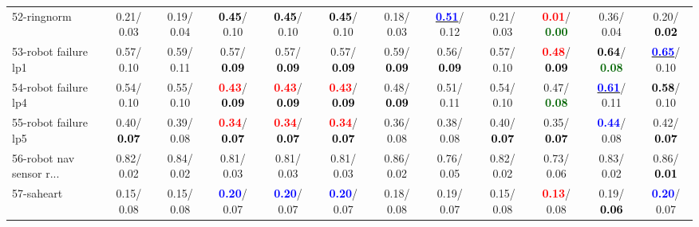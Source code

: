 \begin{table}[h]
\begin{center}
{\begin{tabular}{lc|c|c|c|c|c|c|c|c|c|c}
52-ringnorm &   0.21/  0.03 &   0.19/  0.04 & \textcolor{black}{\textbf{  0.45}}/  0.10 & \textcolor{black}{\textbf{  0.45}}/  0.10 & \textcolor{black}{\textbf{  0.45}}/  0.10 &   0.18/  0.03 & \underline{\textcolor{blue}{\textbf{  0.51}}}/  0.12 &   0.21/  0.03 & \textcolor{red}{\textbf{  0.01}}/\textcolor{darkgreen}{\textbf{  0.00}} &   0.36/  0.04 &   0.20/\textcolor{black}{\textbf{  0.02}} \\
53-robot failure lp1 &   0.57/  0.10 &   0.59/  0.11 &   0.57/\textcolor{black}{\textbf{  0.09}} &   0.57/\textcolor{black}{\textbf{  0.09}} &   0.57/\textcolor{black}{\textbf{  0.09}} &   0.59/\textcolor{black}{\textbf{  0.09}} &   0.56/\textcolor{black}{\textbf{  0.09}} &   0.57/  0.10 & \textcolor{red}{\textbf{  0.48}}/\textcolor{black}{\textbf{  0.09}} & \textcolor{black}{\textbf{  0.64}}/\textcolor{darkgreen}{\textbf{  0.08}} & \underline{\textcolor{blue}{\textbf{  0.65}}}/  0.10 \\ \hline
54-robot failure lp4 &   0.54/  0.10 &   0.55/  0.10 & \textcolor{red}{\textbf{  0.43}}/\textcolor{black}{\textbf{  0.09}} & \textcolor{red}{\textbf{  0.43}}/\textcolor{black}{\textbf{  0.09}} & \textcolor{red}{\textbf{  0.43}}/\textcolor{black}{\textbf{  0.09}} &   0.48/\textcolor{black}{\textbf{  0.09}} &   0.51/  0.11 &   0.54/  0.10 &   0.47/\textcolor{darkgreen}{\textbf{  0.08}} & \underline{\textcolor{blue}{\textbf{  0.61}}}/  0.11 & \textcolor{black}{\textbf{  0.58}}/  0.10 \\
55-robot failure lp5 &   0.40/\textcolor{black}{\textbf{  0.07}} &   0.39/  0.08 & \textcolor{red}{\textbf{  0.34}}/\textcolor{black}{\textbf{  0.07}} & \textcolor{red}{\textbf{  0.34}}/\textcolor{black}{\textbf{  0.07}} & \textcolor{red}{\textbf{  0.34}}/\textcolor{black}{\textbf{  0.07}} &   0.36/  0.08 &   0.38/  0.08 &   0.40/\textcolor{black}{\textbf{  0.07}} &   0.35/\textcolor{black}{\textbf{  0.07}} & \textcolor{blue}{\textbf{  0.44}}/  0.08 &   0.42/\textcolor{black}{\textbf{  0.07}} \\
56-robot nav sensor r... &   0.82/  0.02 &   0.84/  0.02 &   0.81/  0.03 &   0.81/  0.03 &   0.81/  0.03 &   0.86/  0.02 &   0.76/  0.05 &   0.82/  0.02 &   0.73/  0.06 &   0.83/  0.02 &   0.86/\textcolor{black}{\textbf{  0.01}} \\
57-saheart &   0.15/  0.08 &   0.15/  0.08 & \textcolor{blue}{\textbf{  0.20}}/  0.07 & \textcolor{blue}{\textbf{  0.20}}/  0.07 & \textcolor{blue}{\textbf{  0.20}}/  0.07 &   0.18/  0.08 &   0.19/  0.07 &   0.15/  0.08 & \textcolor{red}{\textbf{  0.13}}/  0.08 &   0.19/\textcolor{black}{\textbf{  0.06}} & \textcolor{blue}{\textbf{  0.20}}/  0.07 \\

\end{tabular}}
\end{center}
\end{table}
